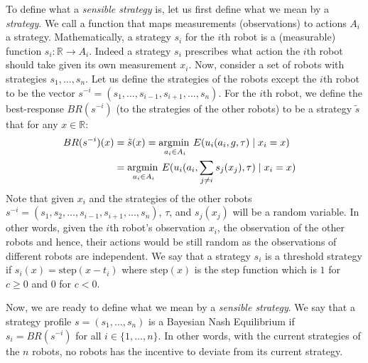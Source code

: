 \documentclass[conference]{ieeeconf}
\DeclareMathOperator*{\argmax}{\arg\!\min\>}
\def\R{\mathbb{R}}
\begin{document}
To define what a \textit{sensible strategy} is, let us first define what we mean by a \textit{strategy}. We call a function that maps measurements (observations) to actions $A_i$ a strategy. Mathematically, a strategy $s_i$ for the $i$th robot is a (measurable) function $s_i:\R\to A_i$. Indeed a strategy $s_i$ prescribes what action the $i$th robot should take given its own measurement $x_i$. Now, consider a set of robots with strategies $s_1,\ldots,s_n$. Let us define the strategies of the robots except the $i$th robot to be the vector $s^{-i}=(s_1,\ldots,s_{i-1},s_{i+1},\ldots,s_n)$. For the $i$th robot, we define the best-response $BR(s^{-i})$ (to the strategies of the other robots) to be a strategy $\tilde{s}$ that for any $x\in \R$: 
\begin{align}\label{eqn:BR}
BR(s^{-i})(x)&=\tilde{s}(x)=\argmax_{a_i\in A_i} E(u_i(a_i,g,\tau)\mid x_i=x)\cr 
&=\argmax_{a_i\in A_i} E(u_i(a_i,\sum_{j\not=i}s_j(x_j),\tau)\mid x_i=x)
\end{align}
Note that given $x_i$ and the strategies of the other robots $s^{-i}=(s_1,s_2,\ldots,s_{i-1},s_{i+1},\ldots,s_n)$, $\tau$, and $s_j(x_j)$ will be a random variable. In other words, given the $i$th robot's observation $x_i$, the observation of the other robots and hence, their actions would be still random as the observations of different robots are independent. We say that a strategy $s_i$ is a threshold strategy if $s_i(x)=\text{step}(x-t_i)$ where $\text{step}(x)$ is the step function which is $1$ for $c\geq 0$ and $0$ for $c<0$.

Now, we are ready to define what we mean by a \textit{sensible strategy}. We say that a strategy profile $s=(s_1,\ldots,s_n)$ is a Bayesian Nash Equilibrium if $s_i=BR(s^{-i})$ for all $i\in \{1,\ldots,n\}$. In other words, with the current strategies of the $n$ robots, no robots has the incentive to deviate from its current strategy.
\end{document}
